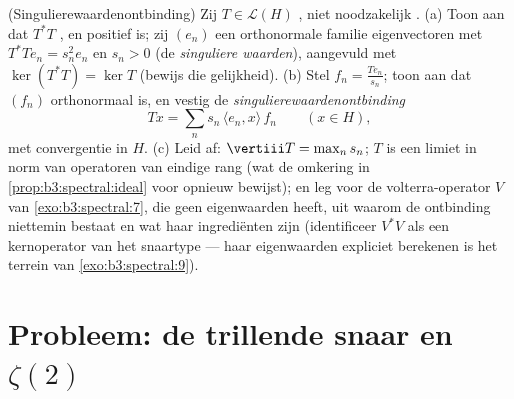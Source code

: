 \begin{exercise}[$\star\star\star$]\label{exo:b3:spectral:12}
(Singulierewaardenontbinding) Zij $T \in \mathcal L(H)$
\emph{}, niet noodzakelijk .
(a) Toon aan dat $T^*T$ ,  en positief is;
zij $(e_n)$ een orthonormale familie eigenvectoren met $T^*Te_n =
s_n^2e_n$ en $s_n > 0$ (de \emph{singuliere waarden}), aangevuld
met $\ker(T^*T) = \ker T$ (bewijs die gelijkheid).
(b) Stel $f_n = \frac{Te_n}{s_n}$; toon aan dat $(f_n)$
orthonormaal is, en vestig de \emph{singulierewaardenontbinding}
\[
Tx = \sum_n s_n\,\langle e_n, x\rangle\,f_n
\qquad (x \in H),
\]
met convergentie in $H$.
(c) Leid af: $\vertiii T = \max_ns_n$; $T$ is een limiet in norm
van operatoren van eindige rang (wat de omkering in
\cref{prop:b3:spectral:ideal} voor  opnieuw
bewijst); en leg voor de volterra-operator $V$ van
\cref{exo:b3:spectral:7}, die geen eigenwaarden heeft, uit
waarom de ontbinding niettemin bestaat en wat haar ingrediënten
zijn (identificeer $V^*V$ als een kernoperator van het snaartype
--- haar eigenwaarden expliciet berekenen is het terrein van
\cref{exo:b3:spectral:9}).
\end{exercise}

\section{Probleem: de trillende snaar en
\texorpdfstring{$\zeta(2)$}{zeta(2)}}

